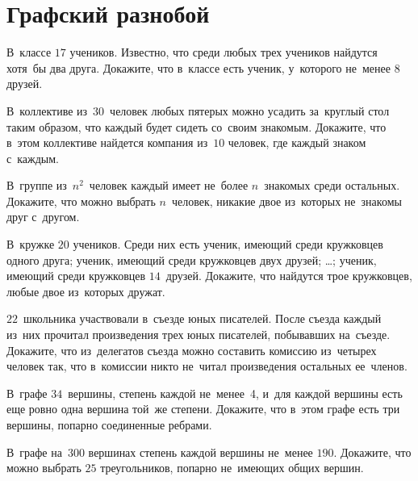 
\section*{Графский разнобой}


\begin{problems}

\item
В~классе $17$ учеников.
Известно, что среди любых трех учеников найдутся хотя~бы два друга.
Докажите, что в~классе есть ученик, у~которого не~менее 8 друзей.

\item
В~коллективе из~$30$~человек любых пятерых можно усадить за~круглый стол таким
образом, что каждый будет сидеть со~своим знакомым.
Докажите, что в~этом коллективе найдется компания из~$10$ человек, где каждый
знаком с~каждым.

\item
В~группе из~$n^2$~человек каждый имеет не~более $n$~знакомых среди остальных.
Докажите, что можно выбрать $n$~человек, никакие двое из~которых не~знакомы
друг с~другом.

\item
В~кружке $20$ учеников.
Среди них есть ученик, имеющий среди кружковцев одного друга;
ученик, имеющий среди кружковцев двух друзей;
\ldots;
ученик, имеющий среди кружковцев $14$~друзей.
Докажите, что найдутся трое кружковцев, любые двое из~которых дружат.

\item
$22$~школьника участвовали в~съезде юных писателей.
После съезда каждый из~них прочитал произведения трех юных писателей,
побывавших на~съезде.
Докажите, что из~делегатов съезда можно составить комиссию из~четырех человек
так, что в~комиссии никто не~читал произведения остальных ее~членов.

\item
В~графе $34$~вершины, степень каждой не~менее~4, и~для каждой вершины есть еще
ровно одна вершина той~же степени.
Докажите, что в~этом графе есть три вершины, попарно соединенные ребрами.

\item
В~графе на~$300$ вершинах степень каждой вершины не~менее $190$.
Докажите, что можно выбрать $25$ треугольников, попарно не~имеющих общих
вершин.


\end{problems}
